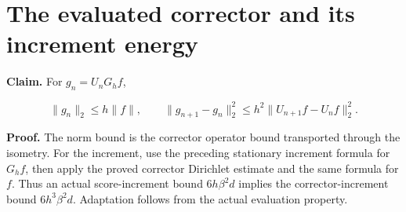 \documentclass[11pt,a4paper]{article}
\begin{document}
\section{\texorpdfstring{The evaluated corrector and its increment energy}{The evaluated corrector and its increment energy}}


\textbf{Claim.} For \(g_n=U_nG_hf\),

\[\|g_n\|_2\le h\|f\|,\qquad \|g_{n+1}-g_n\|_2^2\le h^2\|U_{n+1}f-U_nf\|_2^2.\]

\textbf{Proof.} The norm bound is the corrector operator bound transported through the isometry. For the increment, use the preceding stationary increment formula for \(G_hf\), then apply the proved corrector Dirichlet estimate and the same formula for \(f\). Thus an actual score-increment bound \(6h\beta^2d\) implies the corrector-increment bound \(6h^3\beta^2d\). Adaptation follows from the actual evaluation property.
\end{document}
